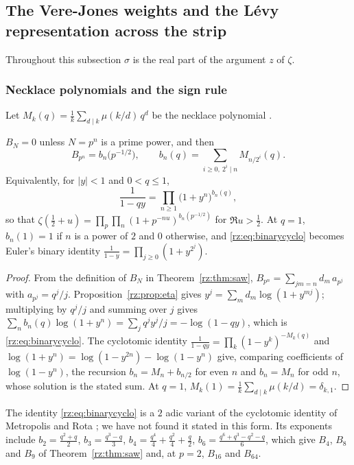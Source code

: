 \subsection{The Vere-Jones weights and the L\'evy representation across the strip}\label{rz:sec:implications}

Throughout this subsection $\sigma$ is the real part of the argument $z$ of $\zeta$.

\subsubsection{Necklace polynomials and the sign rule}

Let $M_k(q)=\frac1k\sum_{d\mid k}\mu(k/d)\,q^d$ be the necklace polynomial \cite{MR}.

\begin{theorem}\label{rz:thm:necklace}
$B_N=0$ unless $N=p^n$ is a prime power, and then
\[
B_{p^n}=b_n\bigl(p^{-1/2}\bigr),\qquad b_n(q)=\sum_{i\ge0,\ 2^i\mid n}M_{n/2^i}(q).
\]
Equivalently, for $|y|<1$ and $0<q\le1$,
\begin{equation}\label{rz:eq:binarycyclo}
\frac1{1-qy}=\prod_{n\ge1}\bigl(1+y^n\bigr)^{b_n(q)},
\end{equation}
so that $\zeta(\frac12+u)=\prod_p\prod_n(1+p^{-nu})^{b_n(p^{-1/2})}$ for $\Re u>\frac12$. At $q=1$, $b_n(1)=1$ if $n$ is a power of $2$ and $0$ otherwise, and \eqref{rz:eq:binarycyclo} becomes Euler's binary identity $\frac1{1-y}=\prod_{j\ge0}(1+y^{2^j})$.
\end{theorem}

\begin{proof}
From the definition of $B_N$ in Theorem~\ref{rz:thm:saw}, $B_{p^n}=\sum_{jm=n}d_m\,a_{p^j}$ with $a_{p^j}=q^j/j$. Proposition~\ref{rz:prop:eta} gives $y^j=\sum_md_m\log(1+y^{mj})$; multiplying by $q^j/j$ and summing over $j$ gives $\sum_nb_n(q)\log(1+y^n)=\sum_jq^jy^j/j=-\log(1-qy)$, which is \eqref{rz:eq:binarycyclo}. The cyclotomic identity $\frac1{1-qy}=\prod_k(1-y^k)^{-M_k(q)}$ and $\log(1+y^n)=\log(1-y^{2n})-\log(1-y^n)$ give, comparing coefficients of $\log(1-y^n)$, the recursion $b_n=M_n+b_{n/2}$ for even $n$ and $b_n=M_n$ for odd $n$, whose solution is the stated sum. At $q=1$, $M_k(1)=\frac1k\sum_{d\mid k}\mu(k/d)=\delta_{k,1}$.
\end{proof}

The identity \eqref{rz:eq:binarycyclo} is a $2$ adic variant of the cyclotomic identity of Metropolis and Rota \cite{MR}; we have not found it stated in this form. Its exponents include $b_2=\frac{q^2+q}2$, $b_3=\frac{q^3-q}3$, $b_4=\frac{q^4}4+\frac{q^2}4+\frac q2$, $b_6=\frac{q^6+q^3-q^2-q}6$, which give $B_4$, $B_8$ and $B_9$ of Theorem~\ref{rz:thm:saw} and, at $p=2$, $B_{16}$ and $B_{64}$.

